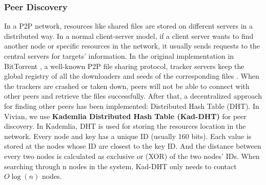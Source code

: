 \subsubsection{Peer Discovery}
In a P2P network, resources like shared files are stored on different servers in a distributed way.
In a normal client-server model, if a client server wants to find another node or specific resources in the network, it usually sends requests to the central servers for targets' information.
In the original implementation in BitTorrent \cite{bram_2008}, a well-known P2P file sharing protocol, tracker servers keep the global registry of all the downloaders and seeds of the corresponding files \cite{pouwelse2005bittorrent}.
When the trackers are crashed or taken down, peers will not be able to connect with other peers and retrieve the files successfully. After that, a decentralized approach for finding other peers has been implemented: Distributed Hash Table (DHT).
In Vivian, we use \textbf{Kademlia Distributed Hash Table (Kad-DHT)} \cite{maymounkov2002kademlia} for peer discovery. In Kademlia, DHT is used for storing the resources location in the network. Every node and key has a unique ID (usually 160 bits).
Each value is stored at the nodes whose ID are closest to the key ID. And the distance between every two nodes is calculated as exclusive or (XOR) of the two nodes' IDs.
When searching through n nodes in the system, Kad-DHT only needs to contact $O\log (n)$ nodes.

